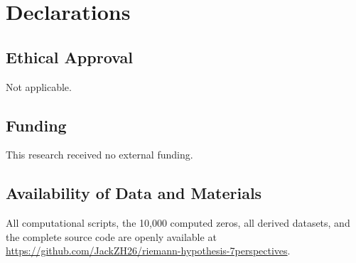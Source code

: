 \documentclass[11pt,a4paper]{article}
\theoremstyle{definition}
\begin{document}
\section*{Declarations}

\subsection*{Ethical Approval}
Not applicable.

\subsection*{Funding}
This research received no external funding.

\subsection*{Availability of Data and Materials}
All computational scripts, the 10{,}000 computed zeros, all derived datasets, and the complete source code are openly available at \url{https://github.com/JackZH26/riemann-hypothesis-7perspectives}.
\end{document}
